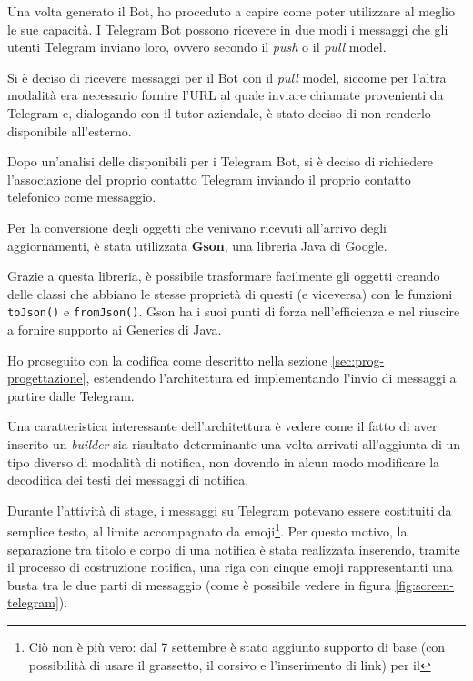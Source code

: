 Una volta generato il Bot, ho proceduto a capire come poter utilizzare al
meglio le sue capacità. I Telegram Bot possono ricevere in due modi i messaggi
che gli utenti Telegram inviano loro, ovvero secondo il \emph{push} o il
\emph{pull} model.

Si è deciso di ricevere messaggi per il Bot con il \emph{pull} model, siccome
per l'altra modalità era necessario fornire l'URL al quale inviare chiamate
 provenienti da Telegram e, dialogando con il tutor aziendale, è
stato deciso di non renderlo disponibile all'esterno.

Dopo un'analisi delle  disponibili per i Telegram Bot, si è deciso
di richiedere l'associazione del proprio contatto Telegram inviando il proprio
contatto telefonico come messaggio.

Per la conversione degli oggetti  che venivano ricevuti all'arrivo
degli aggiornamenti, è stata utilizzata \textbf{Gson}, una libreria Java di
Google.

Grazie a questa libreria, è possibile trasformare facilmente gli oggetti
 creando delle classi che abbiano le stesse proprietà di questi (e
viceversa) con le funzioni \texttt{toJson()} e \texttt{fromJson()}. Gson ha i
suoi punti di forza nell'efficienza e nel riuscire a fornire supporto ai
Generics di Java.

Ho proseguito con la codifica come descritto nella sezione
\ref{sec:prog-progettazione}, estendendo l'architettura ed implementando
l'invio di messaggi a partire dalle  Telegram.

Una caratteristica interessante dell'architettura è vedere come il fatto di
aver inserito un \emph{builder} sia risultato determinante una volta arrivati
all'aggiunta di un tipo diverso di modalità di notifica, non dovendo in alcun
modo modificare la decodifica dei testi dei messaggi di notifica.

Durante l'attività di stage, i messaggi su Telegram potevano essere costituiti
da semplice testo, al limite accompagnato da emoji\footnote{Ciò non è più
vero: dal 7 settembre è stato aggiunto supporto di base (con possibilità di
usare il grassetto, il corsivo e l'inserimento di link) per il
}. Per questo motivo, la separazione tra titolo e corpo di una
notifica è stata realizzata inserendo, tramite il processo di costruzione
notifica, una riga con cinque emoji rappresentanti una busta tra le due parti
di messaggio (come è possibile vedere in figura \ref{fig:screen-telegram}).

